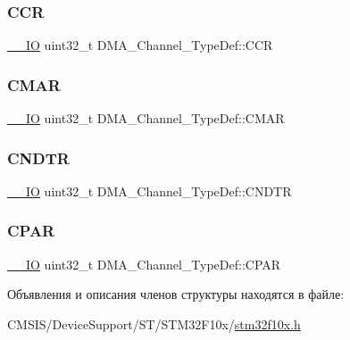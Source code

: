 \subsubsection{\texorpdfstring{CCR}{CCR}}
{\footnotesize\ttfamily \mbox{\hyperlink{group___c_m_s_i_s___c_m3__core__definitions_gaec43007d9998a0a0e01faede4133d6be}{\+\_\+\+\_\+\+IO}} uint32\+\_\+t D\+M\+A\+\_\+\+Channel\+\_\+\+Type\+Def\+::\+C\+CR}

\mbox{\label{struct_d_m_a___channel___type_def_a7a9886b5f9e0edaf5ced3d1870b33ad7}} 
\subsubsection{\texorpdfstring{CMAR}{CMAR}}
{\footnotesize\ttfamily \mbox{\hyperlink{group___c_m_s_i_s___c_m3__core__definitions_gaec43007d9998a0a0e01faede4133d6be}{\+\_\+\+\_\+\+IO}} uint32\+\_\+t D\+M\+A\+\_\+\+Channel\+\_\+\+Type\+Def\+::\+C\+M\+AR}

\mbox{\label{struct_d_m_a___channel___type_def_af1c675e412fb96e38b6b4630b88c5676}} 
\subsubsection{\texorpdfstring{CNDTR}{CNDTR}}
{\footnotesize\ttfamily \mbox{\hyperlink{group___c_m_s_i_s___c_m3__core__definitions_gaec43007d9998a0a0e01faede4133d6be}{\+\_\+\+\_\+\+IO}} uint32\+\_\+t D\+M\+A\+\_\+\+Channel\+\_\+\+Type\+Def\+::\+C\+N\+D\+TR}

\mbox{\label{struct_d_m_a___channel___type_def_a8ce1c9c2742eaaa0e97ddbb3a06154cc}} 
\subsubsection{\texorpdfstring{CPAR}{CPAR}}
{\footnotesize\ttfamily \mbox{\hyperlink{group___c_m_s_i_s___c_m3__core__definitions_gaec43007d9998a0a0e01faede4133d6be}{\+\_\+\+\_\+\+IO}} uint32\+\_\+t D\+M\+A\+\_\+\+Channel\+\_\+\+Type\+Def\+::\+C\+P\+AR}



Объявления и описания членов структуры находятся в файле\+:\begin{DoxyCompactItemize}
\item 
C\+M\+S\+I\+S/\+Device\+Support/\+S\+T/\+S\+T\+M32\+F10x/\mbox{\hyperlink{stm32f10x_8h}{stm32f10x.\+h}}\end{DoxyCompactItemize}
